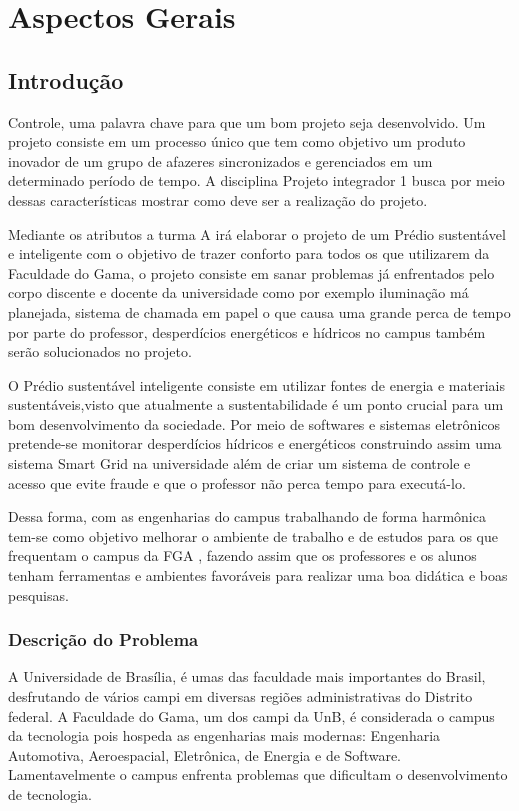 \part{Aspectos Gerais}
\chapter[Introdução]{Introdução}
Controle, uma palavra chave para que um bom projeto seja desenvolvido. Um projeto consiste em um processo único que tem como objetivo um produto inovador de um grupo de afazeres sincronizados e gerenciados em um determinado período de tempo. A disciplina Projeto integrador 1 busca por meio dessas características mostrar como deve ser a realização do projeto.

Mediante os atributos a turma A irá elaborar o projeto de um Prédio sustentável e inteligente com o objetivo de trazer conforto para todos os que utilizarem da Faculdade do Gama, o projeto consiste em sanar problemas já enfrentados pelo corpo discente e docente da universidade como por exemplo iluminação má planejada, sistema de chamada em papel o que causa uma grande perca de tempo por parte do professor, desperdícios energéticos e hídricos no campus também serão solucionados no projeto.

O Prédio sustentável inteligente consiste em utilizar fontes de  energia e materiais sustentáveis,visto que atualmente a sustentabilidade é um ponto crucial para um bom desenvolvimento da sociedade. Por meio de softwares e sistemas eletrônicos pretende-se monitorar desperdícios hídricos e energéticos construindo assim uma sistema Smart Grid na universidade além de criar um sistema de controle e acesso que evite fraude e que o professor não perca tempo para executá-lo.

Dessa forma, com as engenharias do campus trabalhando de forma harmônica tem-se como objetivo melhorar o ambiente de trabalho e de estudos para os que frequentam o campus da FGA , fazendo assim que os professores e os alunos tenham ferramentas e ambientes favoráveis para realizar uma boa didática e boas pesquisas.

\section{Descrição do Problema}
A Universidade de Brasília, é umas das faculdade mais importantes do Brasil, desfrutando de vários campi em diversas regiões administrativas do Distrito federal. A Faculdade do Gama, um dos campi da UnB, é considerada o campus da tecnologia pois hospeda as engenharias mais modernas: Engenharia Automotiva, Aeroespacial, Eletrônica, de Energia e de Software. Lamentavelmente o campus enfrenta problemas que dificultam o desenvolvimento de tecnologia.

